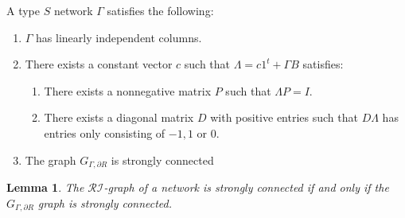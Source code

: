 \documentclass{article}
\newtheorem{lem}{Lemma}
\begin{document}
A type $S$ network $\Gamma$ satisfies the following: 

\begin{enumerate}
    \item $\Gamma$ has linearly independent columns.
    \item There exists a constant vector $c$ such that $\Lambda = c 1^t + \Gamma B$ satisfies:
    \begin{enumerate}
        \item There exists a nonnegative matrix $P$ such that $\Lambda P = I$.
        \item There exists a diagonal matrix $D$ with positive entries such that $D \Lambda$ has entries only consisting of $-1,1$ or $0$.
    \end{enumerate}
    \item The graph $G_{\Gamma, \partial R}$ is strongly connected
\end{enumerate}



\begin{lem}
\label{lem:DSR strong to RI strong}
The \( \mathcal{RI} \)-graph of a network is strongly connected if and only if the \( G_{\Gamma, \partial R} \) graph is strongly connected.
\end{lem}
\end{document}
